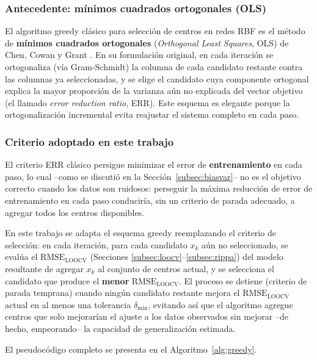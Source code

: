 \documentclass[11pt,a4paper]{article}
\begin{document}
\subsubsection{Antecedente: m\'inimos cuadrados ortogonales (OLS)}

El algoritmo greedy cl\'asico para selecci\'on de centros en redes RBF es el
m\'etodo de \textbf{m\'inimos cuadrados ortogonales} (\emph{Orthogonal Least
Squares}, OLS) de Chen, Cowan y Grant \cite{chen1991}. En su formulaci\'on
original, en cada iteraci\'on se ortogonaliza (v\'ia Gram-Schmidt) la columna
de cada candidato restante contra las columnas ya seleccionadas, y se elige
el candidato cuya componente ortogonal explica la mayor proporci\'on de la
varianza a\'un no explicada del vector objetivo (el llamado \emph{error
reduction ratio}, ERR). Este esquema es elegante porque la ortogonalizaci\'on
incremental evita reajustar el sistema completo en cada paso.

\subsubsection{Criterio adoptado en este trabajo}

El criterio ERR cl\'asico persigue minimizar el error de \textbf{entrenamiento}
en cada paso, lo cual --como se discuti\'o en la
Secci\'on~\ref{subsec:biasvar}-- no es el objetivo correcto cuando los datos
son ruidosos: perseguir la m\'axima reducci\'on de error de entrenamiento en
cada paso conducir\'ia, sin un criterio de parada adecuado, a agregar todos
los centros disponibles.

En este trabajo se adapta el esquema greedy reemplazando el criterio de
selecci\'on: en cada iteraci\'on, para cada candidato $x_k$ a\'un no
seleccionado, se eval\'ua el $\text{RMSE}_{\text{LOOCV}}$ (Secciones
\ref{subsec:loocv}--\ref{subsec:rippa}) del modelo resultante de agregar $x_k$
al conjunto de centros actual, y se selecciona el candidato que produce el
\textbf{menor} $\text{RMSE}_{\text{LOOCV}}$. El proceso se detiene (criterio
de parada temprana) cuando ning\'un candidato restante mejora el
$\text{RMSE}_{\text{LOOCV}}$ actual en al menos una tolerancia
$\delta_{\min}$, evitando as\'i que el algoritmo agregue centros que solo
mejorar\'ian el ajuste a los datos observados sin mejorar --de hecho,
empeorando-- la capacidad de generalizaci\'on estimada.

El pseudoc\'odigo completo se presenta en el Algoritmo~\ref{alg:greedy}.
\end{document}
